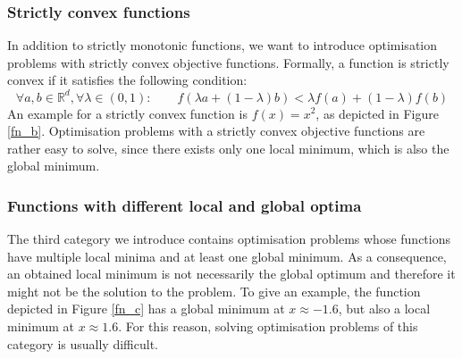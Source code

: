 \subsubsection{Strictly convex functions}
In addition to strictly monotonic functions, we want to introduce optimisation problems with strictly convex objective functions. Formally, a function is strictly convex if it satisfies the following condition:
\[ \forall a, b \in \mathbb{R}^d, \forall \lambda \in (0, 1): \qquad f(\lambda a + (1 - \lambda) b) < \lambda f(a) + (1- \lambda)f(b) \]
An example for a strictly convex function is $f(x) = x^2$, as depicted in Figure \ref{fn_b}. Optimisation problems with a strictly convex objective functions are rather easy to solve, since there exists only one local minimum, which is also the global minimum.
\subsubsection{Functions with different local and global optima}
The third category we introduce contains optimisation problems whose functions have multiple local minima and at least one global minimum. As a consequence, an obtained local minimum is not necessarily the global optimum and therefore it might not be the solution to the problem. To give an example, the function depicted in Figure \ref{fn_c} has a global minimum at $x \approx -1.6$, but also a local minimum at $x \approx 1.6$. For this reason, solving optimisation problems of this category is usually difficult.\\
